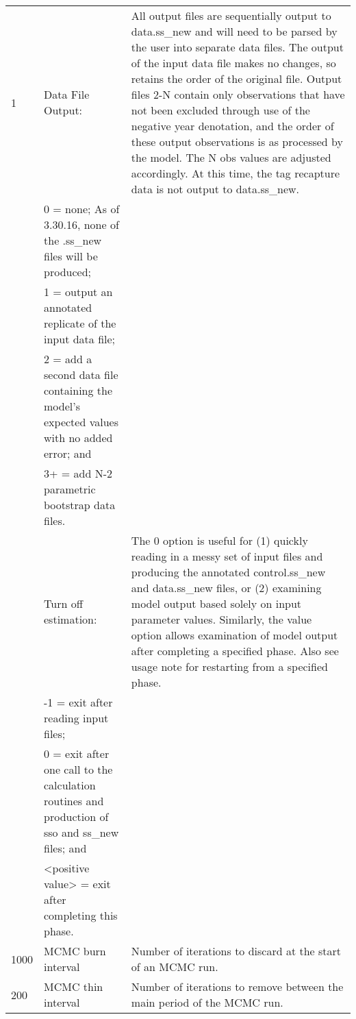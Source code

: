 {\begin{landscape}
\begin{longtable}{p{1.5cm} p{7.2cm} p{12.3cm}}
 
 \hline
 1 & Data File Output: & \multirow{1}{1cm}[-0.25cm]{\parbox{12.5cm}{All output files are sequentially output to data.ss\_new and will need to be parsed by the user into separate data files. The output of the input data file makes no changes, so retains the order of the original file. Output files 2-N contain only observations that have not been excluded through use of the negative year denotation, and the order of these output observations is as processed by the model. The N obs values are adjusted accordingly.  At this time, the tag recapture data is not output to data.ss\_new.}}\Tstrut\\
   & 0 = none; As of 3.30.16, none of the .ss\_new files will be produced;& \\
   & 1 = output an annotated replicate of the input data file; & \\
   & 2 = add a second data file containing the model's expected values with no added error; and & \\
   & 3+ = add N-2 parametric bootstrap data files. & \\

 \pagebreak
 8 & Turn off estimation: &  \multirow{1}{1cm}[-0.25cm]{\parbox{12.5cm}{The 0 option is useful for (1) quickly reading in a messy set of input files and producing the annotated control.ss\_new and data.ss\_new files, or (2) examining model output based solely on input parameter values.  Similarly, the value option allows examination of model output after completing a specified phase.  Also see usage note for restarting from a specified phase.}}\Tstrut\\
   & -1 = exit after reading input files; & \\
   & 0 = exit after one call to the calculation routines and production of sso and ss\_new files; and & \\
   & <positive value> = exit after completing this phase. & \\	  
	     
 \hline
 1000 & MCMC burn interval & Number of iterations to discard at the start of an MCMC run. \Tstrut\\
	   
 \hline
 200 & MCMC thin interval & Number of iterations to remove between the main period of the MCMC run. \Tstrut\\
	   

\end{longtable}
\end{landscape}}
